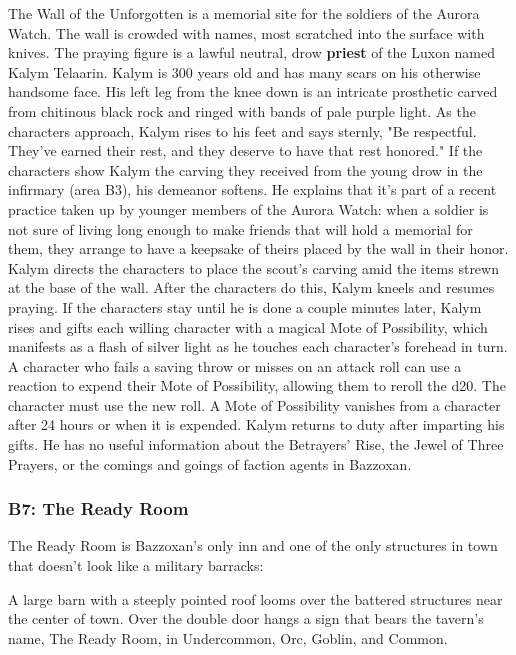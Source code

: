 \documentclass[10pt,a4,twoside,twocolumn,openany,nodeprecatedcode]{dndbook}
\begin{document}
The Wall of the Unforgotten is a memorial site for the soldiers of the Aurora Watch. The wall is crowded with names, most scratched into the surface with knives.
The praying figure is a lawful neutral, drow \textbf{priest} of the Luxon named Kalym Telaarin. Kalym is 300 years old and has many scars on his otherwise handsome face. His left leg from the knee down is an intricate prosthetic carved from chitinous black rock and ringed with bands of pale purple light. As the characters approach, Kalym rises to his feet and says sternly, "Be respectful. They've earned their rest, and they deserve to have that rest honored."
If the characters show Kalym the carving they received from the young drow in the infirmary (area B3), his demeanor softens. He explains that it's part of a recent practice taken up by younger members of the Aurora Watch: when a soldier is not sure of living long enough to make friends that will hold a memorial for them, they arrange to have a keepsake of theirs placed by the wall in their honor.
Kalym directs the characters to place the scout's carving amid the items strewn at the base of the wall. After the characters do this, Kalym kneels and resumes praying. If the characters stay until he is done a couple minutes later, Kalym rises and gifts each willing character with a magical Mote of Possibility, which manifests as a flash of silver light as he touches each character's forehead in turn. A character who fails a saving throw or misses on an attack roll can use a reaction to expend their Mote of Possibility, allowing them to reroll the d20. The character must use the new roll. A Mote of Possibility vanishes from a character after 24 hours or when it is expended.
Kalym returns to duty after imparting his gifts. He has no useful information about the Betrayers' Rise, the Jewel of Three Prayers, or the comings and goings of faction agents in Bazzoxan.
\subsubsection{B7: The Ready Room}
The Ready Room is Bazzoxan's only inn and one of the only structures in town that doesn't look like a military barracks:
\begin{DndReadAloud}{}
A large barn with a steeply pointed roof looms over the battered structures near the center of town. Over the double door hangs a sign that bears the tavern's name, The Ready Room, in Undercommon, Orc, Goblin, and Common.
\end{DndReadAloud}
\end{document}
